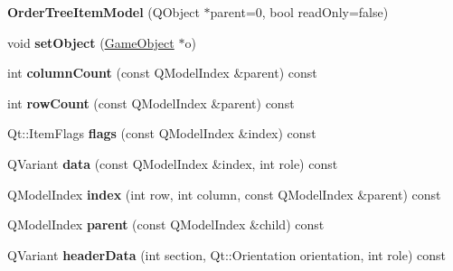 \begin{DoxyCompactItemize}
\item 
\hypertarget{class_order_tree_item_model_afec01e848fc7e130efc66d0636834cb7}{{\bfseries \-Order\-Tree\-Item\-Model} (\-Q\-Object $\ast$parent=0, bool read\-Only=false)}\label{class_order_tree_item_model_afec01e848fc7e130efc66d0636834cb7}

\item 
\hypertarget{class_order_tree_item_model_a421b35f64cd6e0e3e83f14d45ab715c2}{void {\bfseries set\-Object} (\hyperlink{class_game_object}{\-Game\-Object} $\ast$o)}\label{class_order_tree_item_model_a421b35f64cd6e0e3e83f14d45ab715c2}

\item 
\hypertarget{class_order_tree_item_model_a9a997417343636358a5bb8271f1ecb61}{int {\bfseries column\-Count} (const \-Q\-Model\-Index \&parent) const }\label{class_order_tree_item_model_a9a997417343636358a5bb8271f1ecb61}

\item 
\hypertarget{class_order_tree_item_model_a378707aeac6e53783a7188aaa28dad6f}{int {\bfseries row\-Count} (const \-Q\-Model\-Index \&parent) const }\label{class_order_tree_item_model_a378707aeac6e53783a7188aaa28dad6f}

\item 
\hypertarget{class_order_tree_item_model_aa901a049acb852861c761d676a64696b}{\-Qt\-::\-Item\-Flags {\bfseries flags} (const \-Q\-Model\-Index \&index) const }\label{class_order_tree_item_model_aa901a049acb852861c761d676a64696b}

\item 
\hypertarget{class_order_tree_item_model_af2aeab74ae7103d1c8eac28bbfea2daf}{\-Q\-Variant {\bfseries data} (const \-Q\-Model\-Index \&index, int role) const }\label{class_order_tree_item_model_af2aeab74ae7103d1c8eac28bbfea2daf}

\item 
\hypertarget{class_order_tree_item_model_ae56a0ab22e42a499d8b484308b2f8a0f}{\-Q\-Model\-Index {\bfseries index} (int row, int column, const \-Q\-Model\-Index \&parent) const }\label{class_order_tree_item_model_ae56a0ab22e42a499d8b484308b2f8a0f}

\item 
\hypertarget{class_order_tree_item_model_a54fc3379b94036ca4fe3bf19727db848}{\-Q\-Model\-Index {\bfseries parent} (const \-Q\-Model\-Index \&child) const }\label{class_order_tree_item_model_a54fc3379b94036ca4fe3bf19727db848}

\item 
\hypertarget{class_order_tree_item_model_a69d0009a4554fe4768c17d897db62078}{\-Q\-Variant {\bfseries header\-Data} (int section, \-Qt\-::\-Orientation orientation, int role) const }\label{class_order_tree_item_model_a69d0009a4554fe4768c17d897db62078}


\end{DoxyCompactItemize}
